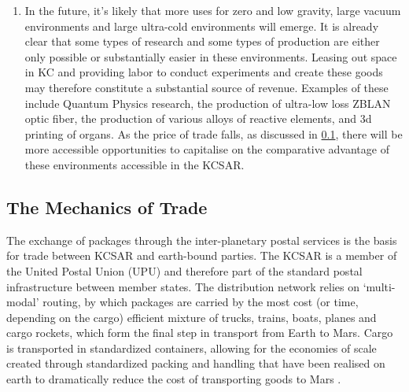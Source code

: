\documentclass[fleqn,10pt]{Stylesheet} %
\begin{document}
\begin{enumerate}
\item In the future, it’s likely that more uses for zero and low gravity, large  vacuum environments and large ultra-cold environments will emerge. It is already clear that some types of research and some types of production are either only possible or substantially easier in these environments. Leasing out space in KC and providing labor to conduct experiments and create these goods may therefore constitute a substantial source of revenue. Examples of these include Quantum Physics research, the production of ultra-low loss ZBLAN optic fiber\cite{Ingo2018}, the production of various alloys of reactive elements\cite{Russel2019}, and 3d printing of organs\cite{Boissonneault2019}.  As the price of trade falls, as discussed in \ref{sec:mechanics_trade}, there will be more accessible opportunities to capitalise on the comparative advantage of these environments accessible in the KCSAR.
\end{enumerate}

\subsection{The Mechanics of Trade}
\label{sec:mechanics_trade}
The exchange of packages through the inter-planetary postal services is the basis for trade between KCSAR and earth-bound parties. The KCSAR is a member of the United Postal Union (UPU) and therefore part of the standard postal infrastructure between member states. The distribution network relies on ‘multi-modal’ routing, by which packages are carried by the most cost (or time, depending on the cargo) efficient mixture of trucks, trains, boats, planes and cargo rockets, which form the final step in transport from Earth to Mars. Cargo is transported in standardized containers, allowing for the economies of scale created through standardized packing and handling that have been realised on earth to dramatically reduce the cost of transporting goods to Mars \cite{Levinson}.
\end{document}
